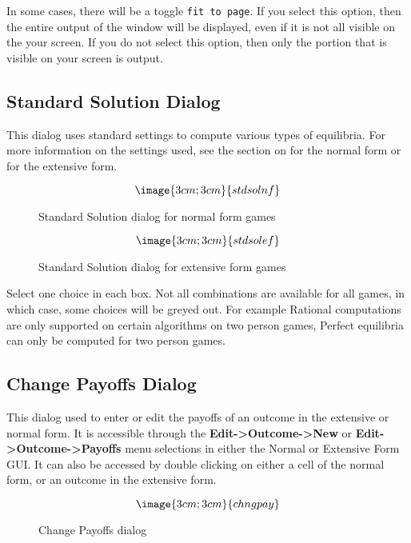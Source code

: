 In some cases, there will be a toggle \verb+fit to page+.  If you
select this option, then the entire output of the window will be
displayed, even if it is not all visible on the your screen.  If you
do not select this option, then only the portion that is visible on
your screen is output.

\subsection{Standard Solution Dialog}\label{StandardSolution}

This dialog uses standard settings to compute various types of
equilibria. For more information on the settings used, see the section
on  for the
normal form or  
for the extensive form.

\begin{figure}
$$\image{3cm;3cm}{stdsolnf}$$
\caption{Standard Solution dialog for normal form
games}\label{fig_standardsolnf}
\end{figure}

\begin{figure}
$$\image{3cm;3cm}{stdsolef}$$
\caption{Standard Solution dialog for extensive form
games}\label{fig_standardsolef}
\end{figure}

Select one choice in each box.  Not all combinations are available for
all games, in which case, some choices will be greyed out.  For
example Rational computations are only supported on certain algorithms
on two person games, Perfect equilibria can only be computed for two
person games.

\subsection{Change Payoffs Dialog}\label{ChangePayoff}

This dialog used to enter or edit the payoffs of an outcome in the
extensive or normal form. It is accessible through the {\bf 
Edit->Outcome->New} or {\bf Edit->Outcome->Payoffs} menu selections in
either the Normal or Extensive Form GUI. It can also be accessed by
double clicking on either a cell of the normal form, or an outcome in
the extensive form. 

\begin{figure}
$$\image{3cm;3cm}{chngpay}$$
\caption{Change Payoffs dialog}\label{fig_changepay}
\end{figure}



